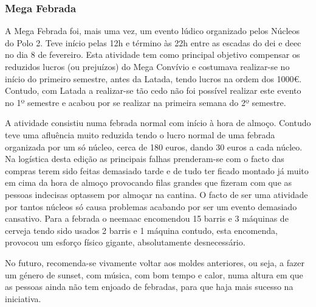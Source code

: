 
\subsubsection{Mega Febrada}

A Mega Febrada foi, mais uma vez, um evento lúdico organizado pelos Núcleos do Polo 2. Teve início pelas 12h e término às 22h entre as escadas do \acrshort{dei} e \acrshort{deec} no dia 8 de fevereiro. Esta atividade tem como principal objetivo compensar os reduzidos lucros (ou prejuízos) do Mega Convívio e costumava realizar-se no início do primeiro semestre, antes da Latada, tendo lucros na ordem dos 1000€. Contudo, com Latada a realizar-se tão cedo não foi possível realizar este evento no 1º semestre e acabou por se realizar na primeira semana do 2º semestre.

A atividade consistiu numa febrada normal com início à hora de almoço. Contudo teve uma afluência muito reduzida tendo o lucro normal de uma febrada organizada por um só núcleo, cerca de 180 euros, dando 30 euros a cada núcleo. Na logística desta edição as principais falhas prenderam-se com o facto das compras terem sido feitas demasiado tarde e de tudo ter ficado montado já muito em cima da hora de almoço provocando filas grandes que fizeram com que as pessoas indecisas optassem por almoçar na cantina. O facto de ser uma atividade por tantos núcleos só causa problemas acabando por ser um evento demasiado cansativo. Para a febrada o \acrshort{neemaac} encomendou 15 barris e 3 máquinas de cerveja tendo sido usados 2 barris e 1 máquina contudo, esta encomenda, provocou um esforço físico gigante, absolutamente desnecessário.

No futuro, recomenda-se vivamente voltar aos moldes anteriores, ou seja, a fazer um género de sunset, com música, com bom tempo e calor, numa altura em que as pessoas ainda não tem enjoado de febradas, para que haja mais sucesso na iniciativa.